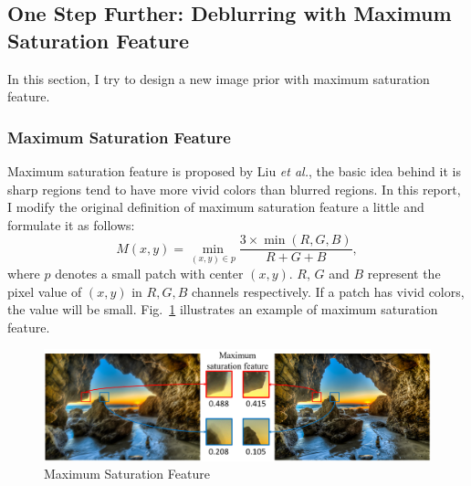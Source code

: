 \documentclass[journal, onecolumn, 10pt]{IEEEtran}
\begin{document}
\subsection{One Step Further: Deblurring with Maximum Saturation Feature}
In this section, I try to design a new image prior with maximum saturation feature\cite{liu2008image}. 
\subsubsection{Maximum Saturation Feature}
Maximum saturation feature is proposed by Liu \emph{et al.}, the basic idea behind it is sharp regions tend to have more vivid colors than blurred regions. In this report, I modify the original definition of maximum saturation feature a little and formulate it as follows:
\begin{equation}
M(x, y) = \min_{(x, y) \in p}\frac{3 \times \min(R, G, B)}{R + G + B},
\end{equation}
where $p$ denotes a small patch with center $(x, y)$. $R$, $G$ and $B$ represent the pixel value of $(x, y)$ in $R, G, B$ channels respectively. If a patch has vivid colors, the value will be small. Fig.~\ref{fig:maximum_saturation_feature} illustrates an example of maximum saturation feature.
\begin{figure}[h!]
\centering
\includegraphics[width = 1\textwidth]{pic/max_sat_feature.png}
\hspace{\fill}
\caption{Maximum Saturation Feature}
\label{fig:maximum_saturation_feature}
\end{figure}
\end{document}
